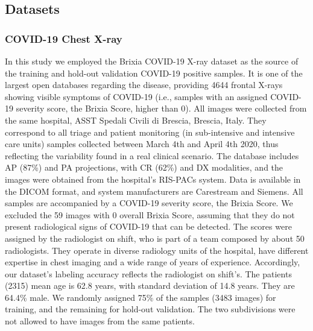 \documentclass[fleqn,10pt]{wlscirep}
\begin{document}
{\subsection{Datasets}
\label{dataset}
\subsubsection{COVID-19 Chest X-ray}
\label{COVIDdataset}

In this study we employed the Brixia COVID-19 X-ray dataset\cite{BrixiaSet} as the source of the training and hold-out validation COVID-19 positive samples. It is one of the largest open databases regarding the disease, providing 4644 frontal X-rays showing visible symptoms of COVID-19 (i.e., samples with an assigned COVID-19 severity score, the Brixia Score, higher than 0). All images were collected from the same hospital, ASST Spedali Civili di Brescia, Brescia, Italy. They correspond to all triage and patient monitoring (in sub-intensive and intensive care units) samples collected between March 4th and April 4th 2020, thus reflecting the variability found in a real clinical scenario\cite{BrixiaSet}. The database includes AP (87\%) and PA projections, with CR (62\%) and DX modalities, and the images were obtained from the hospital's RIS-PACs system. Data is available in the DICOM format, and system manufacturers are Carestream and Siemens. All samples are accompanied by a COVID-19 severity score, the Brixia Score. We excluded the 59 images with 0 overall Brixia Score, assuming that they do not present radiological signs of COVID-19 that can be detected. The scores were assigned by the radiologist on shift, who is part of a team composed by about 50 radiologists. They operate in diverse radiology units of the hospital, have different expertise in chest imaging and a wide range of years of experience\cite{BrixiaSet}. Accordingly, our dataset's labeling accuracy reflects the radiologist on shift's. The patients (2315) mean age is 62.8 years, with standard deviation of 14.8 years. They are 64.4\% male. We randomly assigned 75\% of the samples (3483 images) for training, and the remaining for hold-out validation. The two subdivisions were not allowed to have images from the same patients.

}
\end{document}
